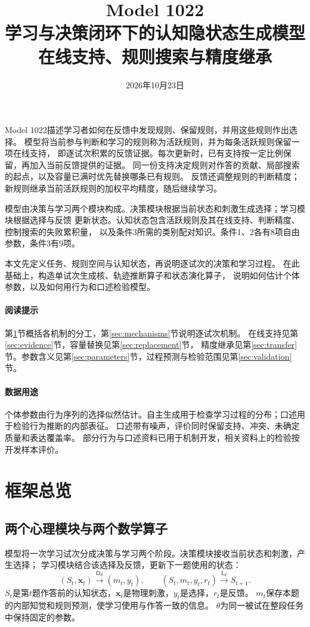 \documentclass[11pt,a4paper]{article}
\title{Model 1022\\[0.5em]
\Large 学习与决策闭环下的认知隐状态生成模型\\[0.5em]
\large 在线支持、规则搜索与精度继承}
\author{}
\date{2026年10月23日}
\numberwithin{equation}{section}
\newcommand{\Dd}{\mathsf{D}}
\newcommand{\Ll}{\mathsf{L}}
\begin{document}
\maketitle
\thispagestyle{empty}

Model 1022描述学习者如何在反馈中发现规则、保留规则，并用这些规则作出选择。
模型将当前参与判断和学习的规则称为活跃规则，并为每条活跃规则保留一项在线支持，
即逐试次积累的反馈证据。每次更新时，已有支持按一定比例保留，再加入当前反馈提供的证据。
同一份支持决定规则对作答的贡献、局部搜索的起点，以及容量已满时优先替换哪条已有规则。
反馈还调整规则的判断精度；新规则继承当前活跃规则的加权平均精度，随后继续学习。

模型由决策与学习两个模块构成。决策模块根据当前状态和刺激生成选择；学习模块根据选择与反馈
更新状态。认知状态包含活跃规则及其在线支持、判断精度、控制搜索的失败累积量，
以及条件3所需的类别配对知识。条件1、2各有8项自由参数，条件3有9项。

本文先定义任务、规则空间与认知状态，再说明逐试次的决策和学习过程。
在此基础上，构造单试次生成核、轨迹推断算子和状态演化算子，
说明如何估计个体参数，以及如何用行为和口述检验模型。

\paragraph{阅读提示}
第\ref{sec:overview}节概括各机制的分工，第\ref{sec:mechanisms}节说明逐试次机制。
在线支持见第\ref{sec:evidence}节，容量替换见第\ref{sec:replacement}节，
精度继承见第\ref{sec:transfer}节。参数含义见第\ref{sec:parameters}节，过程预测与检验范围见第\ref{sec:validation}节。

\paragraph{数据用途}
个体参数由行为序列的选择似然估计。自主生成用于检查学习过程的分布；口述用于检验行为推断的内部表征。
口述带有噪声，评价同时保留支持、冲突、未确定质量和表达覆盖率。
部分行为与口述资料已用于机制开发，相关资料上的检验按开发样本评价。

\clearpage
{\small\setlength{\parskip}{0pt}\tableofcontents}
\clearpage

\section{框架总览}
\label{sec:overview}

\subsection{两个心理模块与两个数学算子}
模型将一次学习试次分成决策与学习两个阶段。决策模块接收当前状态和刺激，产生选择；
学习模块结合该选择及反馈，更新下一题使用的状态：
\begin{equation}
(S_t,\bm x_t)\xrightarrow{\Dd_\theta}(m_t,y_t),\qquad
(S_t,m_t,y_t,r_t)\xrightarrow{\Ll_\theta}S_{t+1}.
\label{eq:loop}
\end{equation}
$S_t$是第$t$题作答前的认知状态，$\bm x_t$是物理刺激，$y_t$是选择，$r_t$是反馈。
$m_t$保存本题的内部知觉和规则预测，使学习使用与作答一致的信息。
$\theta$为同一被试在整段任务中保持固定的参数。
\end{document}
